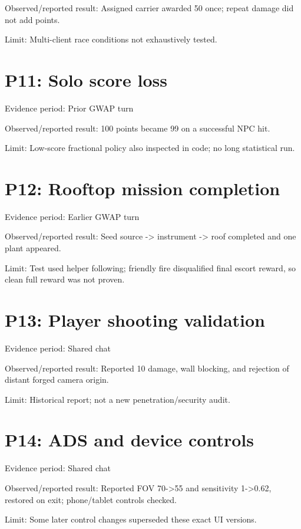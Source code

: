Observed/\allowbreak{}reported result: Assigned carrier awarded 50 once; repeat damage did not add points.\allowbreak{}

Limit: Multi-client race conditions not exhaustively tested.\allowbreak{}

\section{P11: Solo score loss}
Evidence period: Prior GWAP turn

Observed/\allowbreak{}reported result: 100 points became 99 on a successful NPC hit.\allowbreak{}

Limit: Low-score fractional policy also inspected in code; no long statistical run.\allowbreak{}

\section{P12: Rooftop mission completion}
Evidence period: Earlier GWAP turn

Observed/\allowbreak{}reported result: Seed source -> instrument -> roof completed and one plant appeared.\allowbreak{}

Limit: Test used helper following; friendly fire disqualified final escort reward, so clean full reward was not proven.\allowbreak{}

\section{P13: Player shooting validation}
Evidence period: Shared chat

Observed/\allowbreak{}reported result: Reported 10 damage, wall blocking, and rejection of distant forged camera origin.\allowbreak{}

Limit: Historical report; not a new penetration/\allowbreak{}security audit.\allowbreak{}

\section{P14: ADS and device controls}
Evidence period: Shared chat

Observed/\allowbreak{}reported result: Reported FOV 70->55 and sensitivity 1->0.\allowbreak{}62, restored on exit; phone/\allowbreak{}tablet controls checked.\allowbreak{}

Limit: Some later control changes superseded these exact UI versions.\allowbreak{}

